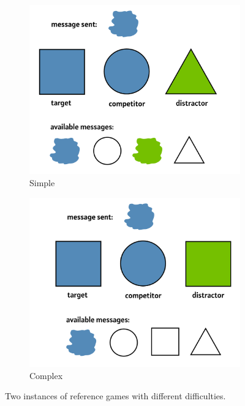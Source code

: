 \begin{figure}
\centering
\begin{subfigure}{.5\textwidth}
  \centering
  \includegraphics[width=1\linewidth]{images/simple.png}
  \caption{Simple}
  \label{fig:simple}
\end{subfigure}%
\begin{subfigure}{.5\textwidth}
  \centering
  \includegraphics[width=1\linewidth]{images/complex.png}
  \caption{Complex}
  \label{fig:complex}
\end{subfigure}
\caption{Two instances of reference games with different difficulties. }
\label{fig:simple_complex}
\end{figure}

